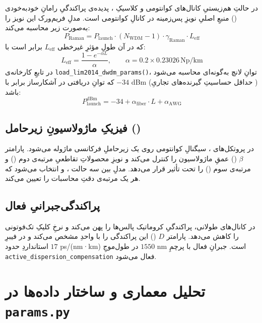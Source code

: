 در حالتِ هم‌زیستیِ کانال‌های کوانتومی و کلاسیکِ ، پدیده‌ی پراکندگیِ رامانِ خودبه‌خودی () منبعِ اصلیِ نویزِ پس‌زمینه در کانالِ کوانتومی است. مدلِ فریم‌ورک این نویز را به‌صورت زیر محاسبه می‌کند:
\begin{equation}
	P_{\text{Raman}} = P_{\text{launch}} \cdot (N_{\text{WDM}} - 1) \cdot \gamma_{\text{Raman}} \cdot L_{\text{eff}}
\end{equation}
که در آن طولِ مؤثرِ غیرخطی $L_{\text{eff}}$ برابر است با:
\begin{equation}
	L_{\text{eff}} = \frac{1 - e^{-\alpha L}}{\alpha}, \qquad \alpha = 0.2 \times 0.23026 \, \text{Np/km}
\end{equation}
در تابعِ کارخانه‌ی \texttt{load\_lim2014\_dwdm\_params()}، توانِ لانچ به‌گونه‌ای محاسبه می‌شود که توانِ دریافتی در آشکارساز برابر با $-34$ dBm (حداقل حساسیتِ گیرنده‌های تجاریِ ) باشد:
\begin{equation}
	P_{\text{launch}}^{\text{dBm}} = -34 + \alpha_{\text{fiber}} \cdot L + \alpha_{\text{AWG}}
\end{equation}

\subsection{فیزیکِ ماژولاسیونِ زیرحامل ()}

در پروتکل‌های ، سیگنالِ کوانتومی روی یک زیرحاملِ فرکانسی ماژوله می‌شود. پارامتر $\beta$ () عمقِ ماژولاسیون را کنترل می‌کند و نویزِ محصولاتِ تقاطعیِ مرتبه‌ی دوم () و مرتبه‌ی سوم () را تحت تأثیر قرار می‌دهد. مدلِ  بین سه حالت ،  و  انتخاب می‌شود که هر یک مرتبه‌ی دقتِ محاسبات را تعیین می‌کند.

\subsection{پراکندگی‌جبرانیِ فعال}

در کانال‌های طولانی، پراکندگیِ کروماتیک پالس‌ها را پهن می‌کند و نرخِ کلیکِ تک‌فوتونی را کاهش می‌دهد. پارامتر $D$ () این پراکندگی را با واحدِ  مشخص می‌کند و در فیبرِ استانداردِ  حدود $17$ ps/(nm·km) در طول‌موجِ $1550$ nm است. جبرانِ فعال با پرچمِ \texttt{active\_dispersion\_compensation} فعال می‌شود.

\section{تحلیل معماری و ساختار داده‌ها در \texttt{params.py}}

